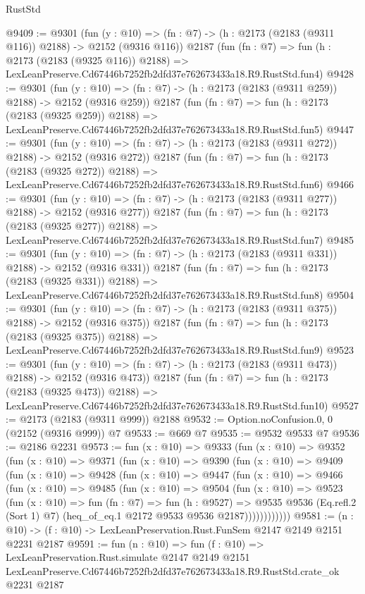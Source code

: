 \begin{lexlean}{RustStd}
\begin{coremodule}
@9409 := @9301
    (fun (y : @10) => (fn : @7) -> (h : @2173 (@2183 (@9311 @116)) @2188) -> @2152 (@9316 @116))
    @2187
    (fun (fn : @7) =>
    fun (h : @2173 (@2183 (@9325 @116)) @2188) =>
    LexLeanPreserve.Cd67446b7252fb2dfd37e762673433a18.R9.RustStd.fun4)
@9428 := @9301
    (fun (y : @10) => (fn : @7) -> (h : @2173 (@2183 (@9311 @259)) @2188) -> @2152 (@9316 @259))
    @2187
    (fun (fn : @7) =>
    fun (h : @2173 (@2183 (@9325 @259)) @2188) =>
    LexLeanPreserve.Cd67446b7252fb2dfd37e762673433a18.R9.RustStd.fun5)
@9447 := @9301
    (fun (y : @10) => (fn : @7) -> (h : @2173 (@2183 (@9311 @272)) @2188) -> @2152 (@9316 @272))
    @2187
    (fun (fn : @7) =>
    fun (h : @2173 (@2183 (@9325 @272)) @2188) =>
    LexLeanPreserve.Cd67446b7252fb2dfd37e762673433a18.R9.RustStd.fun6)
@9466 := @9301
    (fun (y : @10) => (fn : @7) -> (h : @2173 (@2183 (@9311 @277)) @2188) -> @2152 (@9316 @277))
    @2187
    (fun (fn : @7) =>
    fun (h : @2173 (@2183 (@9325 @277)) @2188) =>
    LexLeanPreserve.Cd67446b7252fb2dfd37e762673433a18.R9.RustStd.fun7)
@9485 := @9301
    (fun (y : @10) => (fn : @7) -> (h : @2173 (@2183 (@9311 @331)) @2188) -> @2152 (@9316 @331))
    @2187
    (fun (fn : @7) =>
    fun (h : @2173 (@2183 (@9325 @331)) @2188) =>
    LexLeanPreserve.Cd67446b7252fb2dfd37e762673433a18.R9.RustStd.fun8)
@9504 := @9301
    (fun (y : @10) => (fn : @7) -> (h : @2173 (@2183 (@9311 @375)) @2188) -> @2152 (@9316 @375))
    @2187
    (fun (fn : @7) =>
    fun (h : @2173 (@2183 (@9325 @375)) @2188) =>
    LexLeanPreserve.Cd67446b7252fb2dfd37e762673433a18.R9.RustStd.fun9)
@9523 := @9301
    (fun (y : @10) => (fn : @7) -> (h : @2173 (@2183 (@9311 @473)) @2188) -> @2152 (@9316 @473))
    @2187
    (fun (fn : @7) =>
    fun (h : @2173 (@2183 (@9325 @473)) @2188) =>
    LexLeanPreserve.Cd67446b7252fb2dfd37e762673433a18.R9.RustStd.fun10)
@9527 := @2173 (@2183 (@9311 @999)) @2188
@9532 := Option.noConfusion.{0, 0} (@2152 (@9316 @999)) @7
@9533 := @669 @7
@9535 := @9532 @9533 @7
@9536 := @2186 @2231
@9573 := fun (x : @10) =>
  @9333
    (fun (x : @10) =>
    @9352
      (fun (x : @10) =>
      @9371
        (fun (x : @10) =>
        @9390
          (fun (x : @10) =>
          @9409
            (fun (x : @10) =>
            @9428
              (fun (x : @10) =>
              @9447
                (fun (x : @10) =>
                @9466
                  (fun (x : @10) =>
                  @9485
                    (fun (x : @10) =>
                    @9504
                      (fun (x : @10) =>
                      @9523
                        (fun (x : @10) =>
                        fun (fn : @7) =>
                        fun (h : @9527) =>
                        @9535
                          @9536
                          (Eq.refl.{2} (Sort 1) @7)
                          (heq_of_eq.{1} @2172 @9533 @9536 @2187))))))))))))
@9581 := (n : @10) -> (f : @10) -> LexLeanPreservation.Rust.FunSem @2147 @2149 @2151 @2231 @2187
@9591 := fun (n : @10) =>
  fun (f : @10) =>
  LexLeanPreservation.Rust.simulate
    @2147
    @2149
    @2151
    LexLeanPreserve.Cd67446b7252fb2dfd37e762673433a18.R9.RustStd.crate_ok
    @2231
    @2187
\end{coremodule}
\end{lexlean}
